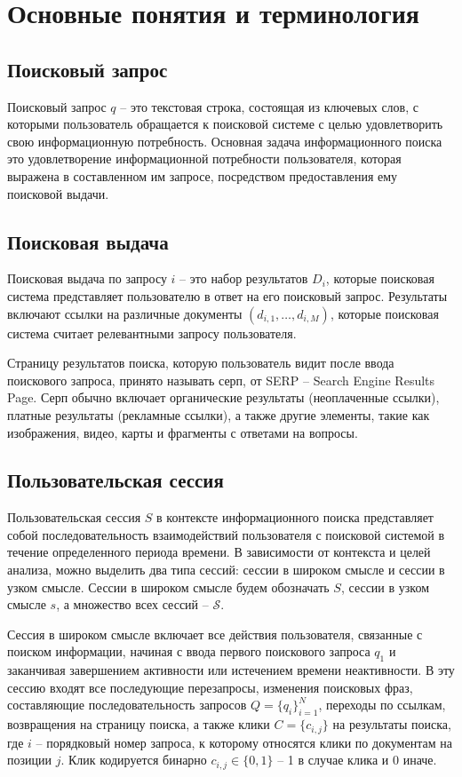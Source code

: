 \documentclass[diploma]{nanolab2015}
\begin{document}
\section{Основные понятия и терминология}
\subsection{Поисковый запрос}
Поисковый запрос $q$ -- это текстовая строка, состоящая из ключевых слов, с которыми пользователь обращается к поисковой системе с целью удовлетворить свою информационную потребность. Основная задача информационного поиска это удовлетворение информационной потребности пользователя, которая выражена в составленном им запросе, посредством предоставления ему поисковой выдачи.

\subsection{Поисковая выдача}

Поисковая выдача по запросу $i$ -- это набор результатов $D_i$, которые поисковая система представляет пользователю в ответ на его поисковый запрос. Результаты включают ссылки на различные документы $(d_{i,1}, \dots, d_{i, M})$, которые поисковая система считает релевантными запросу пользователя.

Страницу результатов поиска, которую пользователь видит после ввода поискового запроса, принято называть серп, от SERP -- Search Engine Results Page. Серп обычно включает органические результаты (неоплаченные ссылки), платные результаты (рекламные ссылки), а также другие элементы, такие как изображения, видео, карты и фрагменты с ответами на вопросы.

\subsection{Пользовательская сессия}

Пользовательская сессия $S$ в контексте информационного поиска представляет собой последовательность взаимодействий пользователя с поисковой системой в течение определенного периода времени. В зависимости от контекста и целей анализа, можно выделить два типа сессий: сессии в широком смысле и сессии в узком смысле. Сессии в широком смысле будем обозначать $S$, сессии в узком смысле $s$, а множество всех сессий -- $\mathcal{S}$.

Сессия в широком смысле включает все действия пользователя, связанные с поиском информации, начиная с ввода первого поискового запроса $q_1$ и заканчивая завершением активности или истечением времени неактивности. В эту сессию входят все последующие перезапросы, изменения поисковых фраз, составляющие последовательность запросов $Q = \{q_i\}_{i=1}^N$, переходы по ссылкам, возвращения на страницу поиска, а также клики $C = \{c_{i,j}\}$ на результаты поиска, где $i$ -- порядковый номер запроса, к которому относятся клики по документам на позиции $j$. Клик кодируется бинарно $c_{i,j} \in \{0, 1\}$ -- 1 в случае клика и 0 иначе.
\end{document}
